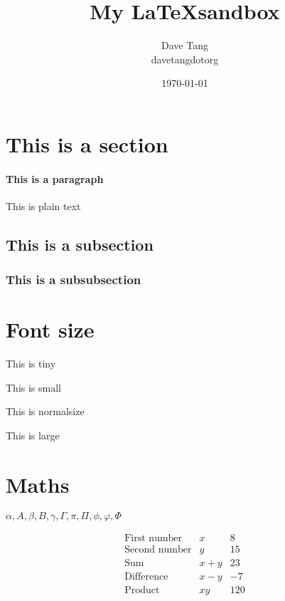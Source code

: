 \documentclass[a4paper, 12pt]{article}
\begin{document}
\title{My \LaTeX sandbox}
\date{\today}
\author{Dave Tang\\ davetangdotorg}
\maketitle

\section{This is a section}

\paragraph{This is a paragraph}

This is plain text

\subsection{This is a subsection}

\subsubsection{This is a subsubsection}

\section{Font size}

\tiny{This is tiny}

\small{This is small}

\normalsize{This is normalsize}

\large{This is large}

\section{Maths}

$\alpha, A, \beta, B, \gamma, \Gamma, \pi, \Pi, \phi, \varphi, \Phi$

\[ \begin{array}{lcr}
\mbox{First number} & x & 8 \\
\mbox{Second number} & y & 15 \\
\mbox{Sum} & x + y & 23 \\
\mbox{Difference} & x - y & -7 \\
\mbox{Product} & xy & 120 \end{array}\] 
\end{document}
